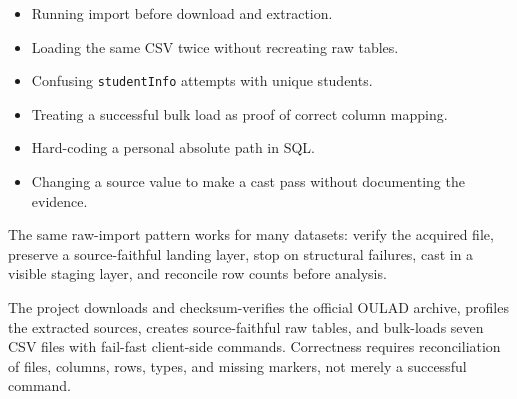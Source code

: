 \begin{commonmistakes}
\begin{itemize}
  \item Running import before download and extraction.
  \item Loading the same CSV twice without recreating raw tables.
  \item Confusing \texttt{studentInfo} attempts with unique students.
  \item Treating a successful bulk load as proof of correct column mapping.
  \item Hard-coding a personal absolute path in SQL.
  \item Changing a source value to make a cast pass without documenting the
    evidence.
\end{itemize}
\end{commonmistakes}

\transferheading
The same raw-import pattern works for many datasets: verify the acquired file,
preserve a source-faithful landing layer, stop on structural failures, cast in
a visible staging layer, and reconcile row counts before analysis.

\begin{summarybox}
The project downloads and checksum-verifies the official OULAD archive, profiles
the extracted sources, creates source-faithful raw tables, and bulk-loads seven
CSV files with fail-fast client-side commands. Correctness requires
reconciliation of files, columns, rows, types, and missing markers, not merely a
successful command.
\end{summarybox}
